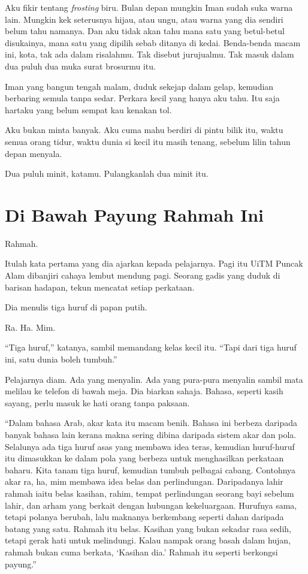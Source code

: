 \documentclass[
  11pt,
  a5paper,
  openany,
  oneside]{book}
\begin{document}
Aku fikir tentang \emph{frosting} biru. Bulan depan mungkin Iman sudah
suka warna lain. Mungkin kek seterusnya hijau, atau ungu, atau warna
yang dia sendiri belum tahu namanya. Dan aku tidak akan tahu mana satu
yang betul-betul disukainya, mana satu yang dipilih sebab ditanya di
kedai. Benda-benda macam ini, kota, tak ada dalam risalahmu. Tak disebut
jurujualmu. Tak masuk dalam dua puluh dua muka surat brosurmu itu.

Iman yang bangun tengah malam, duduk sekejap dalam gelap, kemudian
berbaring semula tanpa sedar. Perkara kecil yang hanya aku tahu. Itu
saja hartaku yang belum sempat kau kenakan tol.

Aku bukan minta banyak. Aku cuma mahu berdiri di pintu bilik itu, waktu
semua orang tidur, waktu dunia si kecil itu masih tenang, sebelum lilin
tahun depan menyala.

Dua puluh minit, katamu. Pulangkanlah dua minit itu.

\chapter{Di Bawah Payung Rahmah Ini}\label{di-bawah-payung-rahmah-ini}

Rahmah.

Itulah kata pertama yang dia ajarkan kepada pelajarnya. Pagi itu UiTM
Puncak Alam dibanjiri cahaya lembut mendung pagi. Seorang gadis yang
duduk di barisan hadapan, tekun mencatat setiap perkataan.

Dia menulis tiga huruf di papan putih.

Ra. Ha. Mim.

``Tiga huruf,'' katanya, sambil memandang kelas kecil itu. ``Tapi dari
tiga huruf ini, satu dunia boleh tumbuh.''

Pelajarnya diam. Ada yang menyalin. Ada yang pura-pura menyalin sambil
mata melilau ke telefon di bawah meja. Dia biarkan sahaja. Bahasa,
seperti kasih sayang, perlu masuk ke hati orang tanpa paksaan.

``Dalam bahasa Arab, akar kata itu macam benih. Bahasa ini berbeza
daripada banyak bahasa lain kerana makna sering dibina daripada sistem
akar dan pola. Selalunya ada tiga huruf asas yang membawa idea teras,
kemudian huruf-huruf itu dimasukkan ke dalam pola yang berbeza untuk
menghasilkan perkataan baharu. Kita tanam tiga huruf, kemudian tumbuh
pelbagai cabang. Contohnya akar ra, ha, mim membawa idea belas dan
perlindungan. Daripadanya lahir rahmah iaitu belas kasihan, rahim,
tempat perlindungan seorang bayi sebelum lahir, dan arham yang berkait
dengan hubungan kekeluargaan. Hurufnya sama, tetapi polanya berubah,
lalu maknanya berkembang seperti dahan daripada batang yang satu. Rahmah
itu belas. Kasihan yang bukan sekadar rasa sedih, tetapi gerak hati
untuk melindungi. Kalau nampak orang basah dalam hujan, rahmah bukan
cuma berkata, `Kasihan dia.' Rahmah itu seperti berkongsi payung.''
\end{document}
